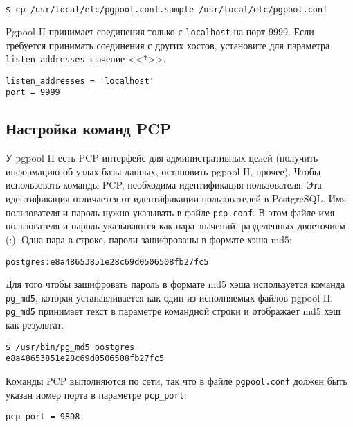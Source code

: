 \begin{lstlisting}[language=Bash,label=lst:pgpool4,caption=Файлы конфигурации]
$ cp /usr/local/etc/pgpool.conf.sample /usr/local/etc/pgpool.conf
\end{lstlisting}

Pgpool-II принимает соединения только с \lstinline!localhost! на порт 9999. Если требуется принимать соединения с других хостов, установите для параметра \lstinline!listen_addresses! значение <<*>>.

\begin{lstlisting}[label=lst:pgpool5,caption=Файлы конфигурации]
listen_addresses = 'localhost'
port = 9999
\end{lstlisting}




\subsection{Настройка команд PCP}

У pgpool-II есть PCP интерфейс для административных целей (получить информацию об узлах базы данных, остановить pgpool-II, прочее). Чтобы использовать команды PCP, необходима идентификация пользователя. Эта идентификация отличается от идентификации пользователей в PostgreSQL. Имя пользователя и пароль нужно указывать в файле \lstinline!pcp.conf!. В этом файле имя пользователя и пароль указываются как пара значений, разделенных двоеточием (:). Одна пара в строке, пароли зашифрованы в формате хэша md5:

\begin{lstlisting}[label=lst:pgpool6,caption=Настройка команд PCP]
postgres:e8a48653851e28c69d0506508fb27fc5
\end{lstlisting}

Для того чтобы зашифровать пароль в формате md5 хэша используется команда \lstinline!pg_md5!, которая устанавливается как один из исполняемых файлов pgpool-II. \lstinline!pg_md5! принимает текст в параметре командной строки и отображает md5 хэш как результат.

\begin{lstlisting}[label=lst:pgpool8,caption=Настройка команд PCP]
$ /usr/bin/pg_md5 postgres
e8a48653851e28c69d0506508fb27fc5
\end{lstlisting}

Команды PCP выполняются по сети, так что в файле \lstinline!pgpool.conf! должен быть указан номер порта в параметре \lstinline!pcp_port!:

\begin{lstlisting}[label=lst:pgpool9,caption=Настройка команд PCP]
pcp_port = 9898
\end{lstlisting}


